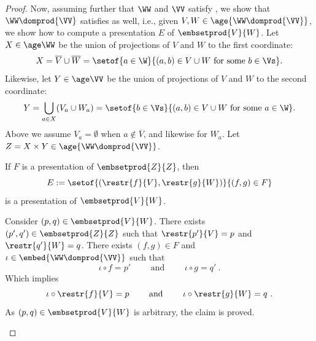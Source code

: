 \begin{proof}

Now, assuming further that $\WW$ and $\VV$ satisfy ,
we show that $\WW \domprod {\VV}$ satisfies  as well, i.e.,
given $V,W \in \age{\WW \domprod {\VV}}$, 
we show how to compute a presentation $E$ of $\embsetprod{V}{W}$.
Let $X\in \age \WW$ be the union of projections of $V$ and $W$ to the first coordinate:
\[
X = \overline{V}\cup\overline{W}
= \setof{a\in\W}{(a,b)\in V\cup W\text{ for some }b\in\Vs}.
\]
Likewise, let $Y\in\age \VV$ be the union of projections of $V$ and $W$ to the second coordinate:
\[
Y = \bigcup_{a\in X} (V_a\cup W_a) = \setof{b\in\Vs}{(a,b)\in V\cup W\text{ for some }a\in\W}.
\]
Above we assume $V_a = \emptyset$ when $a\notin\overline{V}$,
and likewise for $W_a$.
Let $Z = X\times Y \in \age{\WW \domprod {\VV}}$.
%
\begin{claim}\label{clm:embsetprod restr}
If $F$ is a presentation of $\embsetprod{Z}{Z}$,
then
\[
E := \setof{(\restr{f}{V},\restr{g}{W})}{(f,g)\in F}
\]
is a presentation of $\embsetprod{V}{W}$.
\end{claim}
%
\begin{claimproofnew}
Consider $(p,q)\in \embsetprod{V}{W}$.
There exists $(p',q')\in \embsetprod{Z}{Z}$ such that $\restr{p'}{V} = p$ and $\restr{q'}{W} = q$.
There exists $(f,g)\in F$ and $\iota \in \embed{\WW \domprod {\VV}}$ such that
\[
\iota \circ f = p' \qquad \text{ and } \qquad \iota \circ g = q' \ .
\]
Which implies
\[
\iota \circ \restr{f}{V} = p \qquad \text{ and } \qquad \iota \circ \restr{g}{W} = q \ .
\]
As $(p,q)\in \embsetprod{V}{W}$ is arbitrary, the claim is proved.
\end{claimproofnew}


\end{proof}
